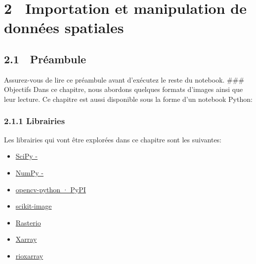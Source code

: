 \label{quarto-document-content}
\label{title-block-header}
\section{\texorpdfstring{\protect\hypertarget{sec-chap01}{}{{2}~
{Importation et manipulation de données
spatiales}}}{2~ Importation et manipulation de données spatiales}}\label{importation-et-manipulation-de-donnuxe9es-spatiales}

\subsection{\texorpdfstring{{2.1} {🚀}
Préambule}{2.1 🚀 Préambule}}\label{pruxe9ambule}

Assurez-vous de lire ce préambule avant d'exécutez le reste du notebook.
\#\#\# {🎯} Objectifs Dans ce chapitre, nous abordons quelques formats
d'images ainsi que leur lecture. Ce chapitre est aussi disponible sous
la forme d'un notebook Python:

\href{https://colab.research.google.com/github/sfoucher/TraitementImagesPythonVol1/blob/main/notebooks/01-ImportationManipulationImages.ipynb}{\pandocbounded{}}

\subsubsection{\texorpdfstring{{2.1.1}
Librairies}{2.1.1 Librairies}}\label{librairies}

Les librairies qui vont être explorées dans ce chapitre sont les
suivantes:

\begin{itemize}
\item
  \href{https://scipy.org/}{SciPy -}
\item
  \href{https://numpy.org/}{NumPy -}
\item
  \href{https://pypi.org/project/opencv-python/}{opencv-python · PyPI}
\item
  \href{https://scikit-image.org/}{scikit-image}
\item
  \href{https://rasterio.readthedocs.io/en/stable/}{Rasterio}
\item
  \href{https://docs.xarray.dev/en/stable/}{Xarray}
\item
  \href{https://corteva.github.io/rioxarray/stable/index.html}{rioxarray}
\end{itemize}

